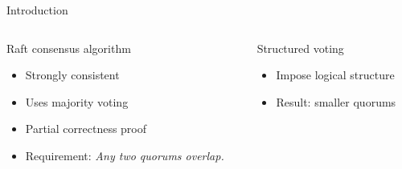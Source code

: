 \documentclass{beamer}
\begin{document}
\begin{frame}{Introduction}
    \begin{columns}[t]
        \begin{column}{.47\textwidth}
            \begin{block}{Raft consensus algorithm}
                \begin{itemize}
                    \item Strongly consistent
                    \item Uses majority voting
                    \item Partial correctness proof
                    \item Requirement: \emph{Any two quorums overlap.}
                \end{itemize}
            \end{block}
        \end{column}
        \begin{column}{.53\textwidth}
            \begin{block}{Structured voting}
                \begin{itemize}
                    \item Impose logical structure
                    \item Result: smaller quorums
                \end{itemize}


\end{block}
\end{column}
\end{columns}
\end{frame}
\end{document}
